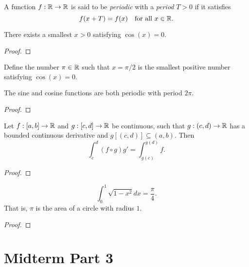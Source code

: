 \documentclass[letterpaper, twoside, 12pt]{book}
\begin{document}
\begin{definition}
  A function \(f:\mathbb R\to\mathbb R\) is said to be \textit{periodic} with
  a \textit{period} \(T>0\) if it satisfies
  \[
    f(x+T)=f(x)
    ~~~\text{for all }x\in\mathbb R
  .\]
\end{definition}

\begin{theorem}[5.7]
  There exists a smallest \(x>0\) satisfying \(\cos(x)=0\).
\end{theorem}
\begin{proof}

\end{proof}

\begin{definition}
  Define the number \(\pi\in\mathbb R\) such that \(x=\pi/2\) is the
  smallest positive number satisfying \(\cos(x)=0\).
\end{definition}

\begin{theorem}[5.8]
  The sine and cosine functions are both periodic with period \(2\pi\).
\end{theorem}
\begin{proof}

\end{proof}

\begin{theorem}
  Let \(f:[a,b]\to\mathbb R\) and \(g:[c,d]\to\mathbb R\) be continuous, such that
  \(g:(c,d)\to\mathbb R\) has a bounded continuous derivative and
  \(g[(c,d)]\subseteq(a,b)\). Then
  \[
    \int_c^d (f\circ g)g'
      =
    \int_{g(c)}^{g(d)} f
  .\]
\end{theorem}
\begin{proof}

\end{proof}

\begin{proposition}
  \[
    \int_0^1\sqrt{1-x^2}dx = \frac{\pi}{4}
  .\]
  That is, \(\pi\) is the area of a circle with radius \(1\).
\end{proposition}
\begin{proof}

\end{proof}











\chapter*{Midterm Part 3}
\end{document}
